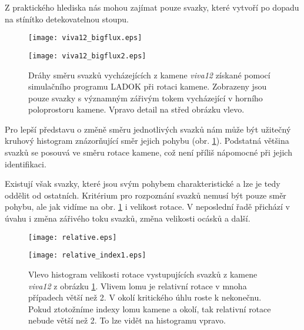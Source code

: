 Z praktického hlediska nás mohou zajímat pouze svazky, které vytvoří po dopadu na stínítko detekovatelnou stoupu.

\begin{figure}[h!]
\begin{center}
   \begin{minipage}[c]{0.48\textwidth}
     \centering \texttt{[image: viva12\_bigflux.eps]}
   \end{minipage}
   \begin{minipage}[c]{0.48\textwidth}
     \centering \texttt{[image: viva12\_bigflux2.eps]}
   \end{minipage}
 \end{center}
\caption[Dráhy pohybu svazků při rotaci kamene.]{Dráhy směru svazků vycházejících z kamene \textit{viva12} získané pomocí simulačního programu  LADOK při rotaci kamene. Zobrazeny jsou pouze svazky s významným zářivým tokem vycházející v horního poloprostoru kamene. Vpravo detail na střed obrázku vlevo.}

\label{fig:relativni pohyb graf}
\end{figure}

Pro lepší představu o změně směru jednotlivých svazků nám může být užitečný kruhový histogram znázorňující směr jejich pohybu (obr. \ref{fig:relativni pohyb graf}). Podstatná většina svazků se posouvá ve směru rotace kamene, což není příliš nápomocné při jejich identifikaci.

Existují však svazky, které jsou svým pohybem charakteristické a lze je tedy oddělit od ostatních. Kritérium pro rozpoznání svazků nemusí být pouze směr pohybu, ale jak vidíme na obr. \ref{fig:relativni pohyb graf} i velikost rotace. V neposlední řadě přichází v úvahu i změna zářivého toku svazků, změna velikosti ocásků a další. 

\begin{figure}[h!]
 \begin{center}
   \begin{minipage}[c]{0.48\textwidth}
     \centering \texttt{[image: relative.eps]} 
   \end{minipage}
   \begin{minipage}[c]{0.48\textwidth}
     \centering \texttt{[image: relative\_index1.eps]} 
   \end{minipage}
 \end{center}
\caption[Histogram velikosti rotace vystupujících svazků.]{Vlevo histogram velikosti rotace vystupujících svazků z kamene \textit{viva12} z obrázku \ref{fig:relativni pohyb graf}. Vlivem lomu je relativní rotace v mnoha případech větší než 2. V okolí kritického úhlu roste k nekonečnu. Pokud ztotožníme indexy lomu kamene a okolí, tak relativní rotace nebude větší než 2. To lze vidět na histogramu vpravo.}

\label{fig:histogram relativni pohyb }

\end{figure}

